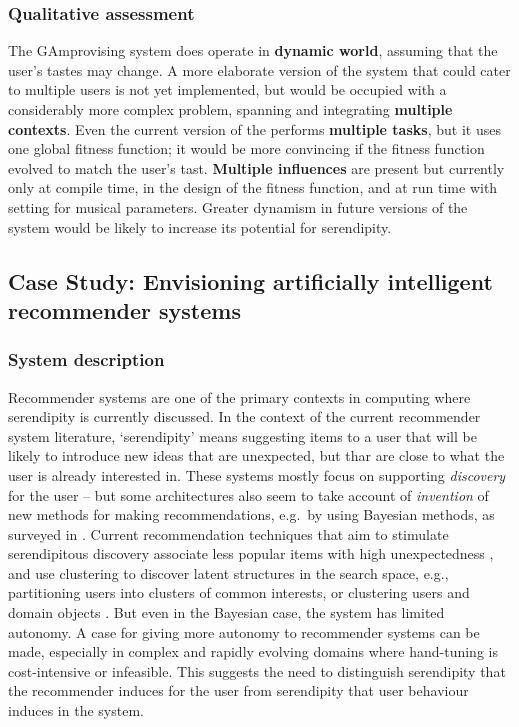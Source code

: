 \subsubsection{Qualitative assessment}

The {\sf GAmprovising} system does operate in \textbf{dynamic world},
assuming that the user's tastes may change.  A more elaborate version
of the system that could cater to multiple users is not yet
implemented, but would be occupied with a considerably more complex
problem, spanning and integrating \textbf{multiple contexts}.  Even
the current version of the performs \textbf{multiple tasks}, but it
uses one global fitness function; it would be more convincing if the
fitness function evolved to match the user's tast.  \textbf{Multiple
  influences} are present but currently only at compile time, in the
design of the fitness function, and at run time with setting for
musical parameters.  Greater dynamism in future versions of the system
would be likely to increase its potential for serendipity.

\subsection{Case Study: Envisioning artificially intelligent recommender systems} \label{sec:nextgenrec}

\subsubsection{System description}

Recommender systems are one of the primary contexts in computing where
serendipity is currently discussed.  In the context of the current
recommender system literature, `serendipity' means suggesting items to
a user that will be likely to introduce new ideas that are unexpected,
but thar are close to what the user is already interested in.  These
systems mostly focus on supporting \emph{discovery} for the user --
but some architectures also seem to take account of \emph{invention}
of new methods for making recommendations, e.g.~by using Bayesian
methods, as surveyed in .  Current
recommendation techniques that aim to stimulate serendipitous
discovery associate less popular items with high unexpectedness
\cite{Herlocker2004,Lu2012}, and use clustering to discover latent
structures in the search space, e.g., partitioning users into clusters
of common interests, or clustering users and domain objects
\cite{Kamahara2005,Onuma2009,Zhang2011}.  But even in the Bayesian
case, the system has limited autonomy.  A case for giving more
autonomy to recommender systems can be made, especially in complex and
rapidly evolving domains where hand-tuning is cost-intensive or
infeasible.  This suggests the need to distinguish serendipity that
the recommender induces for the user from serendipity that user
behaviour induces in the system.

